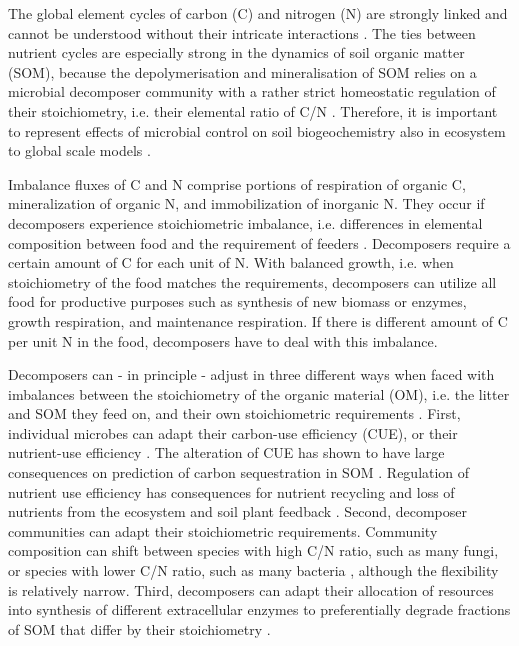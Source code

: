 
\introduction
The global element cycles of carbon (C) and nitrogen (N) are strongly linked and
cannot be understood without their intricate interactions
\citep{Thornton07,Janssens10, Zaehle11}.
The ties between nutrient cycles are especially strong in the dynamics of soil
organic matter (SOM), because the depolymerisation and mineralisation of SOM
relies on a microbial decomposer community with a rather strict homeostatic
regulation of their stoichiometry, i.e. their elemental ratio of C/N \citep{Sterner02,
Zechmeister15}. Therefore, it is important to represent effects of microbial
control on soil biogeochemistry also in ecosystem to global scale models
\citep{Todd-Brown12, Xu14}.  

Imbalance fluxes of C and N comprise portions of respiration of organic C,
mineralization of organic N, and immobilization of inorganic N. They occur if
decomposers experience stoichiometric imbalance, i.e. differences in elemental
composition between food and the requirement of feeders \citep{Sterner02}.
Decomposers require a certain amount of C for each unit of N.
With balanced growth, i.e. when stoichiometry of the food matches
the requirements, decomposers can utilize all food for productive
purposes such as synthesis of new biomass or enzymes, growth respiration, and maintenance
respiration. If there is different amount of C per unit N in the food,
decomposers have to deal with this imbalance.
 
Decomposers can - in principle - adjust in three different ways when faced with
imbalances between the stoichiometry of the organic material (OM), i.e. the
litter and SOM they feed on, and their own stoichiometric requirements
\citep{Mooshammer14}.
First, individual microbes can adapt their carbon-use efficiency (CUE), or their
nutrient-use efficiency \citep{Sinsabaugh13}. The alteration of CUE has
shown to have large consequences on prediction of carbon sequestration in SOM
\citep{Allison14a, Wieder13}.
Regulation of nutrient use efficiency has consequences for nutrient recycling
and loss of nutrients from the ecosystem \citep{Mooshammer14a} and soil plant
feedback \citep{Rastetter11}.
Second, decomposer communities can adapt their stoichiometric requirements.
Community composition can shift between species with high C/N ratio, such as
many fungi, or species with lower C/N ratio, such as many bacteria
\citep{Cleveland07, Xu13}, although the flexibility is relatively narrow.
Third, decomposers can adapt their allocation of resources into synthesis of
different extracellular enzymes to preferentially degrade fractions of SOM that
differ by their stoichiometry \citep{Moorhead12}. 

